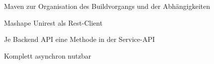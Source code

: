 \begin{frame}

\begin{block}{}
	Maven zur Organisation des Buildvorgangs und der Abhängigkeiten
\end{block}
\begin{block}{}
	Mashape Unirest als Rest-Client
\end{block}
\begin{block}{}
	Je Backend API eine Methode in der Service-API
\end{block}
\begin{block}{}
	Komplett asynchron nutzbar
\end{block}

\end{frame}